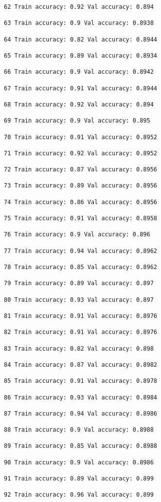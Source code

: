 \documentclass[11pt]{article}
\begin{document}
\begin{Verbatim}[commandchars=\\\{\}]
62 Train accuracy: 0.92 Val accuracy: 0.894

63 Train accuracy: 0.9 Val accuracy: 0.8938

64 Train accuracy: 0.82 Val accuracy: 0.8944

65 Train accuracy: 0.89 Val accuracy: 0.8934

66 Train accuracy: 0.9 Val accuracy: 0.8942

67 Train accuracy: 0.91 Val accuracy: 0.8944

68 Train accuracy: 0.92 Val accuracy: 0.894

69 Train accuracy: 0.9 Val accuracy: 0.895

70 Train accuracy: 0.91 Val accuracy: 0.8952

71 Train accuracy: 0.92 Val accuracy: 0.8952

72 Train accuracy: 0.87 Val accuracy: 0.8956

73 Train accuracy: 0.89 Val accuracy: 0.8956

74 Train accuracy: 0.86 Val accuracy: 0.8956

75 Train accuracy: 0.91 Val accuracy: 0.8958

76 Train accuracy: 0.9 Val accuracy: 0.896

77 Train accuracy: 0.94 Val accuracy: 0.8962

78 Train accuracy: 0.85 Val accuracy: 0.8962

79 Train accuracy: 0.89 Val accuracy: 0.897

80 Train accuracy: 0.93 Val accuracy: 0.897

81 Train accuracy: 0.91 Val accuracy: 0.8976

82 Train accuracy: 0.91 Val accuracy: 0.8976

83 Train accuracy: 0.82 Val accuracy: 0.898

84 Train accuracy: 0.87 Val accuracy: 0.8982

85 Train accuracy: 0.91 Val accuracy: 0.8978

86 Train accuracy: 0.93 Val accuracy: 0.8984

87 Train accuracy: 0.94 Val accuracy: 0.8986

88 Train accuracy: 0.9 Val accuracy: 0.8988

89 Train accuracy: 0.85 Val accuracy: 0.8988

90 Train accuracy: 0.9 Val accuracy: 0.8986

91 Train accuracy: 0.89 Val accuracy: 0.899

92 Train accuracy: 0.96 Val accuracy: 0.899


\end{Verbatim}
\end{document}
